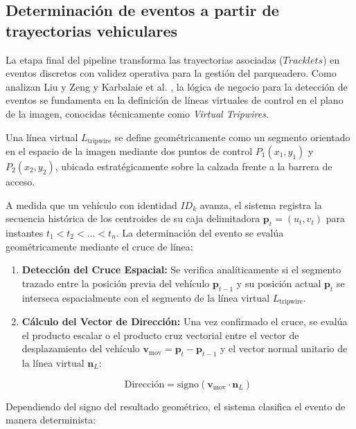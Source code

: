\subsection{Determinación de eventos a partir de trayectorias vehiculares}

La etapa final del pipeline transforma las trayectorias asociadas ($Tracklets$)
en eventos discretos con validez operativa para la gestión del parqueadero. Como
analizan Liu y Zeng \cite{liu2017vehiclecounting} y Karbalaie et al.
\cite{karbalaie2022event}, la lógica
de negocio para la detección de eventos se fundamenta en la definición de líneas
virtuales de control en el plano de la imagen, conocidas técnicamente como
\textit{Virtual Tripwires}.

Una línea virtual $L_{\text{tripwire}}$ se define geométricamente como un
segmento orientado en el espacio de la imagen mediante dos puntos de control
$P_1(x_1, y_1)$ y $P_2(x_2, y_2)$, ubicada estratégicamente sobre la calzada
frente a la barrera de acceso.

A medida que un vehículo con identidad $ID_k$ avanza, el sistema registra la
secuencia histórica de los centroides de su caja delimitadora $\mathbf{p}_t =
(u_t, v_t)$ para instantes $t_1 < t_2 < \dots < t_n$. La determinación del
evento se evalúa geométricamente mediante el cruce de línea:

\begin{enumerate}
    \item \textbf{Detección del Cruce Espacial:} Se verifica analíticamente si
        el segmento trazado entre la posición previa del vehículo $\mathbf{p}_{t-1}$
        y su posición actual $\mathbf{p}_t$ se interseca espacialmente con el
        segmento de la línea virtual $L_{\text{tripwire}}$.
    \item \textbf{Cálculo del Vector de Dirección:} Una vez confirmado el cruce,
        se evalúa el producto escalar o el producto cruz vectorial entre el
        vector de desplazamiento del vehículo $\mathbf{v}_{\text{mov}} =
        \mathbf{p}_t - \mathbf{p}_{t-1}$ y el vector normal unitario de la línea
        virtual $\mathbf{n}_L$:
    
    \begin{equation}
    \text{Dirección} = \text{signo}\left( \mathbf{v}_{\text{mov}} \cdot \mathbf{n}_L \right)
    \end{equation}
\end{enumerate}

Dependiendo del signo del resultado geométrico, el sistema clasifica el evento
de manera determinista:

